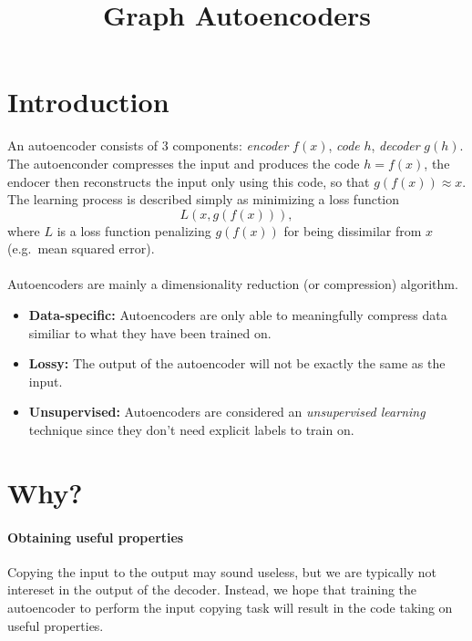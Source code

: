 \documentclass[pdftex,10pt,a4paper]{scrartcl}
\title{Graph Autoencoders}
\date{\vspace{-5ex}}
\begin{document}
\maketitle

\section{Introduction}

An autoencoder consists of 3 components: \emph{encoder} $f(x)$, \emph{code} $h$, \emph{decoder} $g(h)$.
The autoenconder compresses the input and produces the code $h = f(x)$, the endocer then reconstructs the input only using this code, so that $g(f(x)) \approx x$.
The learning process is described simply as minimizing a loss function
\begin{equation*}
  L(x, g(f(x))),
\end{equation*}
where $L$ is a loss function penalizing $g(f(x))$ for being dissimilar from $x$ (e.g.\ mean squared error).
\\\\
Autoencoders are mainly a dimensionality reduction (or compression) algorithm.

\begin{itemize}
  \item \textbf{Data-specific:} Autoencoders are only able to meaningfully compress data similiar to what they have been trained on.
  \item \textbf{Lossy:} The output of the autoencoder will not be exactly the same as the input.
  \item \textbf{Unsupervised:} Autoencoders are considered an \emph{unsupervised learning} technique since they don't need explicit labels to train on.
\end{itemize}

\section{Why?}

\paragraph{Obtaining useful properties}

Copying the input to the output may sound useless, but we are typically not intereset in the output of the decoder.
Instead, we hope that training the autoencoder to perform the input copying task will result in the code taking on useful properties.
\end{document}
